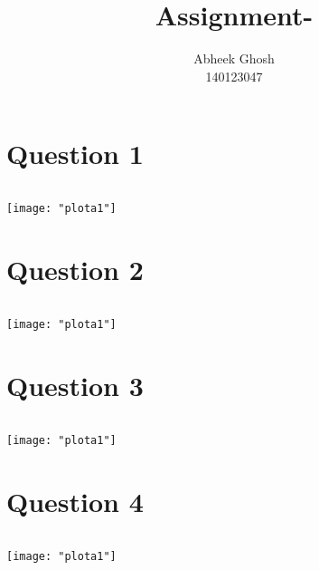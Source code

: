 \documentclass{article}
\begin{document}
	\title{\textbf{Assignment-}}
	\author{Abheek Ghosh \\ 
		140123047 }
	
	\maketitle
	

\section{Question 1}


\begin{lstlisting}[language=R]

\end{lstlisting}

\texttt{[image: "plota1"]}
\pagebreak


\section{Question 2}


\begin{lstlisting}[language=R]

\end{lstlisting}

\texttt{[image: "plota1"]}
\pagebreak

\section{Question 3}


\begin{lstlisting}[language=R]

\end{lstlisting}

\texttt{[image: "plota1"]}
\pagebreak

\section{Question 4}


\begin{lstlisting}[language=R]

\end{lstlisting}

\texttt{[image: "plota1"]}
\pagebreak
\end{document}
